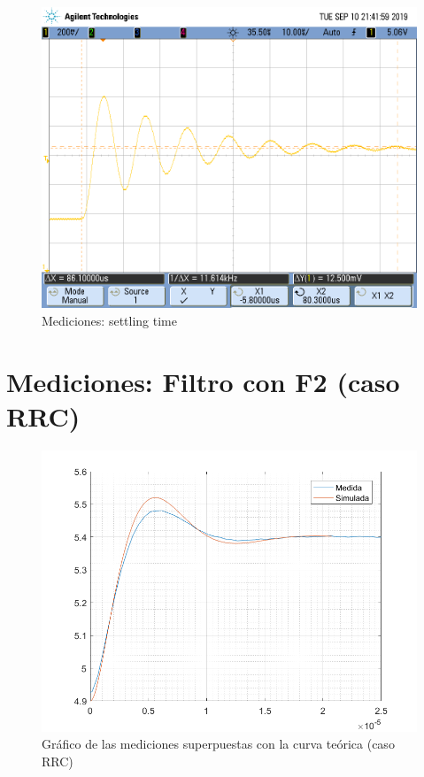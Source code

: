 \documentclass{article}
\begin{document}
\begin{figure}[H]
\centering
\includegraphics[width=0.8\linewidth]{images/settling_time.PNG}
\caption{Mediciones: settling time}
\label{fig:ts}
\end{figure}

\newpage

\section*{Mediciones: Filtro con F2 (caso RRC)}
\begin{figure}[H]
\centering
\includegraphics[width=0.8\linewidth]{images/conF2_superpuestas05.PNG}
\caption{Gráfico de las mediciones superpuestas con la curva teórica (caso RRC)}
\label{fig:superpF2}
\end{figure}
\end{document}
